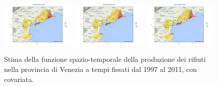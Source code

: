 \documentclass[a4paper,11pt,twoside,openright]{book}							%
\begin{document}
\begin{figure}[H]
\includegraphics[trim=0cm 0cm 4cm 0cm,clip=true,width=0.32\textwidth]{Immagini/venezia_con_covariate/Maps2009.png}
\includegraphics[trim=0cm 0cm 4cm 0cm,clip=true,width=0.32\textwidth]{Immagini/venezia_con_covariate/Maps2010.png}
\includegraphics[trim=0cm 0cm 4cm 0cm,clip=true,width=0.32\textwidth]{Immagini/venezia_con_covariate/Maps2011.png}
\caption{Stima della funzione spazio-temporale della produzione dei rifiuti nella provincia di Venezia a tempi fissati dal 1997 al 2011, con covariata.}
\label{fig:Vencovar_ris}
\end{figure}
\end{document}
